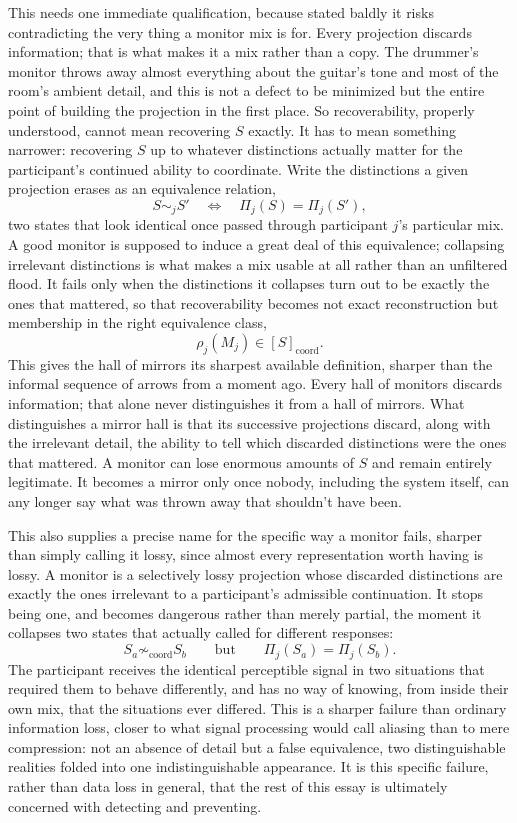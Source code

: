 \documentclass[12pt]{article}
\begin{document}
This needs one immediate qualification, because stated baldly it risks contradicting the very thing a monitor mix is for. Every projection discards information; that is what makes it a mix rather than a copy. The drummer's monitor throws away almost everything about the guitar's tone and most of the room's ambient detail, and this is not a defect to be minimized but the entire point of building the projection in the first place. So recoverability, properly understood, cannot mean recovering $S$ exactly. It has to mean something narrower: recovering $S$ up to whatever distinctions actually matter for the participant's continued ability to coordinate. Write the distinctions a given projection erases as an equivalence relation,
\[
S \sim_j S' \quad\Longleftrightarrow\quad \Pi_j(S) = \Pi_j(S'),
\]
two states that look identical once passed through participant $j$'s particular mix. A good monitor is supposed to induce a great deal of this equivalence; collapsing irrelevant distinctions is what makes a mix usable at all rather than an unfiltered flood. It fails only when the distinctions it collapses turn out to be exactly the ones that mattered, so that recoverability becomes not exact reconstruction but membership in the right equivalence class,
\[
\rho_j(M_j) \in [S]_{\mathrm{coord}}.
\]
This gives the hall of mirrors its sharpest available definition, sharper than the informal sequence of arrows from a moment ago. Every hall of monitors discards information; that alone never distinguishes it from a hall of mirrors. What distinguishes a mirror hall is that its successive projections discard, along with the irrelevant detail, the ability to tell which discarded distinctions were the ones that mattered. A monitor can lose enormous amounts of $S$ and remain entirely legitimate. It becomes a mirror only once nobody, including the system itself, can any longer say what was thrown away that shouldn't have been.

This also supplies a precise name for the specific way a monitor fails, sharper than simply calling it lossy, since almost every representation worth having is lossy. A monitor is a selectively lossy projection whose discarded distinctions are exactly the ones irrelevant to a participant's admissible continuation. It stops being one, and becomes dangerous rather than merely partial, the moment it collapses two states that actually called for different responses:
\[
S_a \not\sim_{\mathrm{coord}} S_b \qquad\text{but}\qquad \Pi_j(S_a) = \Pi_j(S_b).
\]
The participant receives the identical perceptible signal in two situations that required them to behave differently, and has no way of knowing, from inside their own mix, that the situations ever differed. This is a sharper failure than ordinary information loss, closer to what signal processing would call aliasing than to mere compression: not an absence of detail but a false equivalence, two distinguishable realities folded into one indistinguishable appearance. It is this specific failure, rather than data loss in general, that the rest of this essay is ultimately concerned with detecting and preventing.
\end{document}
